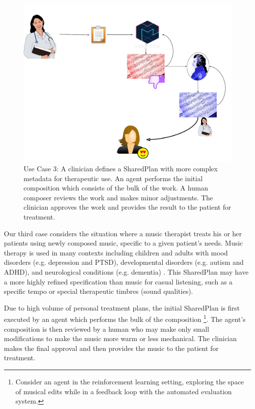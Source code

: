 \documentclass[final,authoryear,5p,times,twocolumn]{elsarticle}
\begin{document}
\begin{figure}
	\includegraphics[scale=0.35]{clinical.pdf}
	\caption{Use Case 3: A clinician defines a SharedPlan with more complex metadata for therapeutic use. An agent performs the initial composition which consists of the bulk of the work.	A human composer reviews the work and makes minor adjustments. The clinician approves the work and provides the result to the patient for treatment.}
	\label{fig:clinical}
\end{figure}

Our third case considers the situation where a music therapist treats his or her patients using newly composed music, specific to a given patient's needs. Music therapy is used in many contexts including children and adults with mood disorders (e.g. depression and PTSD), developmental disorders (e.g. autism and ADHD), and neurological conditions (e.g. dementia) \citep{hole2015music}. This SharedPlan may have a more highly refined specification than music for casual listening, such as a specific tempo or special therapeutic timbres (sound qualities). 

Due to high volume of personal treatment plans, the initial SharedPlan is first executed by an agent which performs the bulk of the composition \footnote{Consider an agent in the reinforcement learning setting, exploring the space of musical edits while in a feedback loop with the automated evaluation system.}. The agent's composition is then reviewed by a human who may make only small modifications to make the music more warm or less mechanical. The clinician makes the final approval and then provides the music to the patient for treatment.
\end{document}
